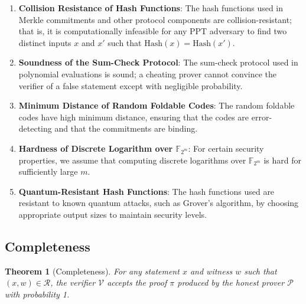\documentclass{article}
\theoremstyle{plain}
\newtheorem{theorem}{Theorem}[section]
\theoremstyle{definition}
\theoremstyle{remark}
\theoremstyle{problem}
\begin{document}
\begin{enumerate}
    \item \textbf{Collision Resistance of Hash Functions}: The hash functions used in Merkle commitments and other protocol components are collision-resistant; that is, it is computationally infeasible for any PPT adversary to find two distinct inputs \(x\) and \(x'\) such that \(\text{Hash}(x) = \text{Hash}(x')\).

    \item \textbf{Soundness of the Sum-Check Protocol}: The sum-check protocol used in polynomial evaluations is sound; a cheating prover cannot convince the verifier of a false statement except with negligible probability.

    \item \textbf{Minimum Distance of Random Foldable Codes}: The random foldable codes have high minimum distance, ensuring that the codes are error-detecting and that the commitments are binding.

    \item \textbf{Hardness of Discrete Logarithm over \(\mathbb{F}_{2^m}\)}: For certain security properties, we assume that computing discrete logarithms over \(\mathbb{F}_{2^m}\) is hard for sufficiently large \(m\).

    \item \textbf{Quantum-Resistant Hash Functions}: The hash functions used are resistant to known quantum attacks, such as Grover's algorithm, by choosing appropriate output sizes to maintain security levels.
\end{enumerate}

\subsection{Completeness}

\begin{theorem}[Completeness]
\label{thm:completeness}
For any statement \(x\) and witness \(w\) such that \((x, w) \in \mathcal{R}\), the verifier \(\mathcal{V}\) accepts the proof \(\pi\) produced by the honest prover \(\mathcal{P}\) with probability 1.
\end{theorem}
\end{document}
